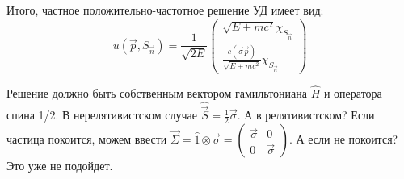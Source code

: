 Итого, частное положительно-частотное решение УД имеет вид:
\[
u(\vec{p}, S_{\vec{n}}) = \frac{1}{\sqrt{2E}} \begin{pmatrix} \sqrt{E + mc^2} \chi_{S_{\vec{n}}} \\ \frac{c(\vec{\sigma}\vec{p})}{\sqrt{E + mc^2}} \chi_{S_{\vec{n}}} \end{pmatrix}
\]

Решение должно быть собственным вектором гамильтониана $\hat{H}$ и оператора спина 1/2. В нерелятивистском случае $\hat{\vec{S}} = \frac{1}{2}\vec{\sigma}$. А в релятивистском? Если частица покоится, можем ввести $\vec{\Sigma} = \hat{1} \otimes \vec{\sigma} = \begin{pmatrix} \vec{\sigma} & 0 \\ 0 & \vec{\sigma} \end{pmatrix}$. А если не покоится? Это уже не подойдет.
